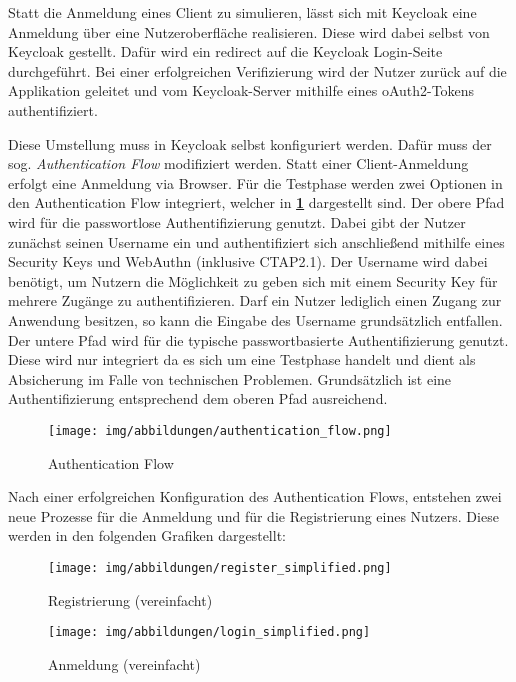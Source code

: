 Statt die Anmeldung eines Client zu simulieren, lässt sich mit  Keycloak eine Anmeldung über eine Nutzeroberfläche realisieren. Diese wird dabei selbst von Keycloak gestellt. Dafür wird ein redirect auf die Keycloak Login-Seite durchgeführt. Bei einer erfolgreichen Verifizierung wird der Nutzer zurück auf die Applikation geleitet und vom Keycloak-Server mithilfe eines oAuth2-Tokens authentifiziert. 

Diese Umstellung muss in Keycloak selbst konfiguriert werden. Dafür muss der sog. \textit{Authentication Flow} modifiziert werden. Statt einer Client-Anmeldung erfolgt eine Anmeldung via Browser. Für die Testphase werden zwei Optionen in den Authentication Flow integriert, welcher in \textbf{\ref{auth-flow}} dargestellt sind. Der obere Pfad wird für die passwortlose Authentifizierung genutzt. Dabei gibt der Nutzer zunächst seinen Username ein und authentifiziert sich anschließend mithilfe eines Security Keys und WebAuthn (inklusive CTAP2.1). Der Username wird dabei benötigt, um Nutzern die Möglichkeit zu geben sich mit einem Security Key für mehrere Zugänge zu authentifizieren. Darf ein Nutzer lediglich einen Zugang zur Anwendung besitzen, so kann die Eingabe des Username grundsätzlich entfallen. Der untere Pfad wird für die typische passwortbasierte Authentifizierung genutzt. Diese wird nur integriert da es sich um eine Testphase handelt und dient als Absicherung im Falle von technischen Problemen. Grundsätzlich ist eine Authentifizierung entsprechend dem oberen Pfad ausreichend.

\begin{figure}[H]
	\centering 
	\texttt{[image: img/abbildungen/authentication\_flow.png]}
	\captionsetup{format=hang}
	\caption{Authentication Flow} \label{auth-flow}
\end{figure}

Nach einer erfolgreichen Konfiguration des Authentication Flows, entstehen zwei neue Prozesse für die Anmeldung und für die Registrierung eines Nutzers. Diese werden in den folgenden Grafiken dargestellt:

\begin{figure}[H]
	\centering 
	\texttt{[image: img/abbildungen/register\_simplified.png]}
	\captionsetup{format=hang}
	\caption{Registrierung (vereinfacht)}
\end{figure}

\begin{figure}[H]
	\centering 
	\texttt{[image: img/abbildungen/login\_simplified.png]}
	\captionsetup{format=hang}
	\caption{Anmeldung (vereinfacht)}
\end{figure}


